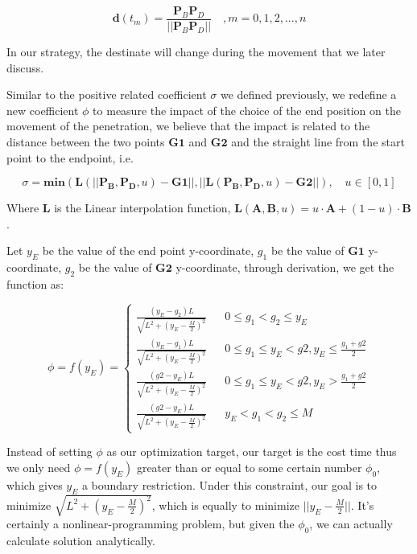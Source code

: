 \documentclass{mcmthesis}
\begin{document}
\begin{equation}
\mathbf{d}(t_m)=\frac{\mathbf{P}_B \mathbf{P}_D}{\vert \vert \mathbf{P}_B \mathbf{P}_D \vert \vert} \quad ,m = 0, 1, 2, ..., n
\end{equation}

In our strategy, the destinate will change during the movement that we later discuss. \par

Similar to the positive related coefficient $\sigma$ we defined previously,  we redefine a new coefficient $\phi$ to measure the impact of the choice of the end position on the movement of the penetration,  we believe that the impact is related to the distance between the two points $\mathbf{G1}$ and $\mathbf{G2}$ and the straight line from the start point to the endpoint, i.e.

\begin{equation}
\sigma = \mathbf{min}(\mathbf{L}(\vert \vert \mathbf{P_B}, \mathbf{P_D}, u) - \mathbf{G1} \lvert \lvert, \lvert \lvert \mathbf{L}(\mathbf{P_B}, \mathbf{P_D}, u) - \mathbf{G2} \lvert \lvert), \quad u \in [0, 1]
\end{equation}

Where \textbf{L} is the Linear interpolation function, $\mathbf{L}(\mathbf{A}, \mathbf{B}, u) = u \cdot \mathbf{A} + (1 - u) \cdot \mathbf{B}$. \par

Let $y_E$ be the value of the end point y-coordinate, $g_1$ be the value of $\mathbf{G1}$ y-coordinate, $g_2$ be the value of $\mathbf{G2}$ y-coordinate, through derivation, we get the function as:

\begin{equation}
\phi=f(y_E)=\left\{
\begin{array}{rcl}
\frac{(y_E - g_2)L}{\sqrt{L^2+(y_E-\frac{M}{2})^2}} & & 0 \leq g_1 < g_2 \leq y_E \\  
\frac{(y_E - g_1)L}{\sqrt{L^2+(y_E-\frac{M}{2})^2}} & & 0 \leq g_1 \leq y_E < g2, y_E \leq \frac{g_1 + g2}{2}\\
\frac{(g2 - y_E)L}{\sqrt{L^2+(y_E-\frac{M}{2})^2}} & & 0 \leq g_1 \leq y_E < g2, y_E > \frac{g_1 + g2}{2}\\ 
\frac{(g2 - y_E)L}{\sqrt{L^2+(y_E-\frac{M}{2})^2}} & & y_E < g_1 < g_2 \leq M
\end{array} \right.
\end{equation}

Instead of setting $\phi$ as our optimization target, our target is the cost time thus we only need $\phi = f(y_E)$ greater than or equal to some certain number $\phi_0$, which gives $y_E$ a boundary restriction. Under this constraint, our goal is to minimize $\sqrt{L^2+(y_E - \frac{M}{2})^2}$, which is equally to minimize $\vert \vert y_E - \frac{M}{2} \vert \vert$. It's certainly a nonlinear-programming problem, but given the $\phi_0$, we can actually calculate solution analytically. \par
\end{document}
